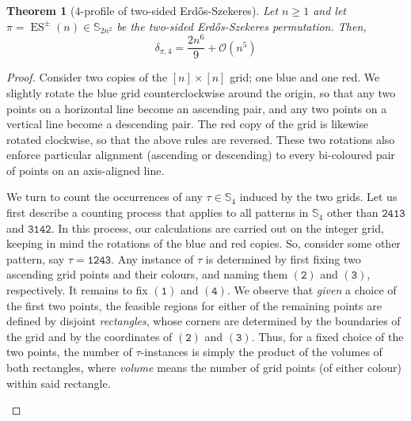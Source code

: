 \documentclass{article}
\newtheorem{theorem}{Theorem}[section]
\DeclareMathOperator{\ES}{ES}
\newcommand{\ESZ}{Erd\H{o}s-Szekeres\xspace}
\theoremstyle{remark}
\newcommand{\perm}[1]{(\mathtt{ #1 })}
\theoremstyle{plain}
\begin{document}
\begin{theorem} [$4$-profile of two-sided \ESZ]
    \label{thm:prof_mod_es}
    Let $n \ge 1$ and let $\pi = \ES^{\pm}(n) \in \mathbb{S}_{2n^2}$ be the two-sided \ESZ permutation. Then, 
    \[
        \delta_{\pi, 4} = \frac{2n^6}{9} + \mathcal{O}(n^5)
    \]
\end{theorem}
\begin{proof}
    Consider two copies of the $[n] \times [n]$ grid; one blue and one red. We slightly rotate the blue grid counterclockwise around the origin, so that any two points on a horizontal line become an ascending pair, and any two points on a vertical line become a descending pair. The red copy of the grid is likewise rotated clockwise, so that the above rules are reversed. These two rotations also enforce particular alignment (ascending or descending) to every bi-coloured pair of points on an axis-aligned line.
    
    We turn to count the occurrences of any $\tau \in \mathbb{S}_4$ induced by the two grids. Let us first describe a counting process that applies to all patterns in $\mathbb{S}_4$ other than $\mathtt{2413}$ and $\mathtt{3142}$. In this process, our calculations are carried out on the integer grid, keeping in mind the rotations of the blue and red copies. So, consider some other pattern, say $\tau = \mathtt{1243}$.
    Any instance of $\tau$ is determined by first fixing two ascending grid points and their colours, and naming them $\perm{2}$ and $\perm{3}$, respectively. It remains to fix $\perm{1}$ and $\perm{4}$. We observe that \emph{given} a choice of the first two points, the feasible regions for either of the remaining points are defined by disjoint \emph{rectangles}, whose corners are determined by the boundaries of the grid and by the coordinates of $\perm{2}$ and $\perm{3}$. Thus, for a fixed choice of the two points, the number of $\tau$-instances is simply the product of the volumes of both rectangles, where {\em volume} means the number of grid points (of either colour) within said rectangle.
    
    \begin{figure}[H]
        \centering
\end{figure}
\end{proof}
\end{document}
